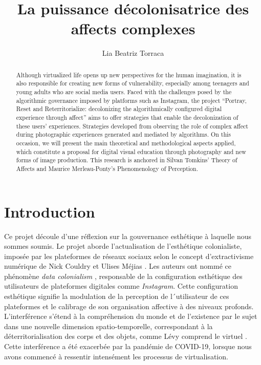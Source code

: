 \documentclass[final,fra]{anthology-ch}         %
\title{La puissance décolonisatrice des affects complexes}
\author[1]{Lia Beatriz Torraca}[
  orcid=0000-0002-3860-8500,
  email=metaffectus@gmail.coml
]
\affiliation{1}{Universidade do Estado do Rio de Janeiro, Brésil}
\begin{document}
\maketitle

\begin{abstract}
    Although virtualized life opens up new perspectives for the human imagination, it is also responsible for creating new forms of vulnerability, especially among teenagers and young adults who are social media users. Faced with the challenges posed by the algorithmic governance imposed by platforms such as Instagram, the project ``Portray, Reset and Reterritorialize: decolonizing the algorithmically configured digital experience through affect'' aims to offer strategies that enable the decolonization of these users' experiences. Strategies developed from observing the role of complex affect during photographic experiences generated and mediated by algorithms. On this occasion, we will present the main theoretical and methodological aspects applied, which constitute a proposal for digital visual education through photography and new forms of image production. This research is anchored in Silvan Tomkins' Theory of Affects and Maurice Merleau-Ponty's Phenomenology of Perception.
\end{abstract}

\section{Introduction}\label{introduction-1}

Ce projet découle d'une réflexion sur la gouvernance esthétique à laquelle nous sommes soumis. Le projet aborde l'actualisation de l'esthétique colonialiste, imposée par les plateformes de réseaux sociaux selon le concept d'extractivisme numérique de Nick Couldry et Ulises Méjias \cite{couldry2019costs}. Les auteurs ont nommé ce phénomène \textit{data colonialism} \cite{couldry2019costs}, responsable de la configuration esthétique des utilisateurs de plateformes digitales comme \textit{Instagram}. Cette configuration esthétique signifie la modulation de la perception de l´utilisateur de ces plateformes et le calibrage de son organisation affective à des niveaux profonds. L'interférence s'étend à la compréhension du monde et de l'existence par le sujet dans une nouvelle dimension spatio-temporelle, correspondant à la déterritorialisation des corps et des objets, comme Lévy comprend le virtuel \cite{levy2007virtual}. Cette interférence a été exacerbée par la pandémie de COVID-19, lorsque nous avons commencé à ressentir intensément les processus de virtualisation.  
\end{document}
